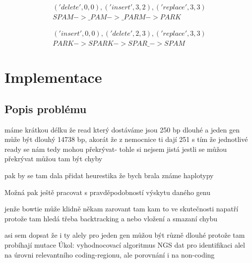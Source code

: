 \documentclass[czech,DP]{thesiskiv}
\numberwithin{equation}{section}
\begin{document}
\begin{align}
   \label{leve_1} ('delete', 0, 0), ('insert', 3, 2), ('replace', 3, 3) \\
    SPAM -> \_PAM -> \_PARM -> PARK \nonumber
\end{align}

\begin{align}
   \label{leve_2} ('insert', 0, 0), ('delete', 2, 3), ('replace', 3, 3) \\
    PARK -> SPARK -> SPAR\_ -> SPAM \nonumber
\end{align}



\chapter{Implementace}
\section{Popis problému}
máme krátkou délku
že read který dostáváme jsou 250 bp dlouhé a jeden gen může být dlouhý 14738 bp, akorát že z nemocnice ti dají 251
s tím že jednotlivé ready se nám tedy mohou překrývat- tohle si nejsem jistá jestli se můžou překrývat
můžou tam být chyby


pak by se tam dala přidat heurestika že bych brala známe haplotypy

Možná pak ještě pracovat s pravděpodobností výskytu daného genu


jenže bowtie může klidně někam zarovant tam kam to ve skutečnosti napatří protože tam hledá třeba backtracking a nebo vložení a smazaní chybu


asi sem dopsat že i ty alely pro jeden gen můžou být různě dlouhé protože tam probíhají mutace
Úkol: vyhodnocovací algoritmus NGS dat pro identifikaci alel na úrovni relevantního coding-regionu, ale porovnání i na non-coding
\end{document}
